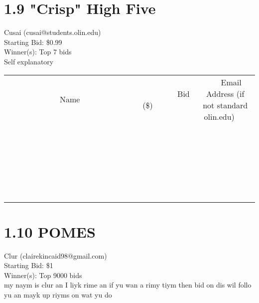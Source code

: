 \documentclass[11pt]{article}
\begin{document}
\section*{1.9 "Crisp" High Five}
Cusai (cusai@students.olin.edu) \\
Starting Bid: \$0.99 \\
Winner(s): 
Top 7 bids \\
Self explanatory \\[6ex]
\begin{tabular}{c c c}
~~~~~~~~~~~~~Name~~~~~~~~~~~~~ & ~~~~~~~~~Bid (\$)~~~~~~~~~ & ~~~Email Address (if not standard olin.edu)~~~ \\
 & & \\
\hline
 & & \\
\hline
 & & \\
\hline
 & & \\
\hline
 & & \\
\hline
 & & \\
\hline
 & & \\
\hline
 & & \\
\hline
 & & \\
\hline
 & & \\
\hline
 & & \\
\hline
 & & \\
\hline
 & & \\
\hline
 & & \\
\hline
 & & \\
\hline
 & & \\
\hline
 & & \\
\hline
 & & \\
\hline
 & & \\
\hline
 & & \\
\hline
 & & \\
\hline
 & & \\
\hline
 & & \\
\hline
 & & \\
\hline
 & & \\
\hline
 & & \\
\hline
\end{tabular}
\clearpage
\section*{1.10 POMES}
Clur (clairekincaid98@gmail.com) \\
Starting Bid: \$1 \\
Winner(s): 
Top 9000 bids \\
my naym is clur
an I liyk rime
an if yu wan
a rimy tiym
then bid on dis
wil follo yu
an mayk up riyms
on wat yu do
\end{document}
